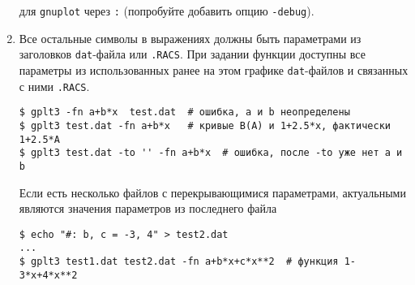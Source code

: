\documentclass[12pt]{article}
\def\gnuplot{{\tt gnuplot}}
\begin{document}
\begin{enumerate}
  для \gnuplot{} через \verb':' (попробуйте добавить опцию \verb'-debug').
\item Все остальные символы в выражениях должны быть параметрами из заголовков \verb'dat'-файла или \verb'.RACS'. 
При задании функции доступны все параметры из использованных ранее на этом графике \verb'dat'-файлов и связанных с ними \verb'.RACS'.
\begin{verbatim}
$ gplt3 -fn a+b*x  test.dat  # ошибка, a и b неопределены
$ gplt3 test.dat -fn a+b*x   # кривые B(A) и 1+2.5*x, фактически 1+2.5*A
$ gplt3 test.dat -to '' -fn a+b*x  # ошибка, после -to уже нет a и b
\end{verbatim}
Если есть несколько файлов с перекрывающимися параметрами, актуальными являются значения параметров из последнего файла
\begin{verbatim}
$ echo "#: b, c = -3, 4" > test2.dat 
...
$ gplt3 test1.dat test2.dat -fn a+b*x+c*x**2  # функция 1-3*x+4*x**2
\end{verbatim}
\end{enumerate}
\end{document}
